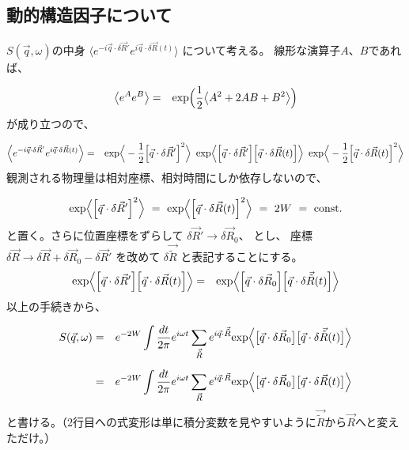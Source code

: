 \documentclass[a4j]{jsarticle}
\begin{document}
\subsection*{動的構造因子について}

$S(\vec{q},\omega)$の中身
$\big\langle e^{ - i \vec{q} \cdot \delta \vec{R}' } e^{i \vec{q} \cdot \delta \vec{R}(t) } \big\rangle$
について考える。
線形な演算子$A$、$B$であれば、


\begin{eqnarray}
	\big\langle e^{ A } e^{ B } \big\rangle
	&=&
	{\rm exp} \Big( \dfrac{1}{2} \big\langle A^{2} + 2 AB + B^{2} \big\rangle \Big)
\end{eqnarray}
が成り立つので、


\begin{eqnarray}
	\Big\langle e^{ - i \vec{q} \cdot \delta \vec{R}' } e^{i \vec{q} \cdot \delta \vec{R}(t) } \Big\rangle
	&=&
	{\rm exp} \Big\langle - \dfrac{1}{2} \Big[ \vec{q} \cdot \delta \vec{R}' \Big]^{2} \Big\rangle
	\ \ \!
	{\rm exp} \Big\langle \Big[ \vec{q} \cdot \delta \vec{R}' \Big] \Big[ \vec{q} \cdot \delta \vec{R}(t) \Big] \Big\rangle
	\ \ \!
	{\rm exp} \Big\langle - \dfrac{1}{2} \Big[ \vec{q} \cdot \delta \vec{R}(t) \Big]^{2} \Big\rangle
	\nonumber \\
\end{eqnarray}
観測される物理量は相対座標、相対時間にしか依存しないので、


\begin{eqnarray}
	{\rm exp} \Big\langle \Big[ \vec{q} \cdot \delta \vec{R}' \Big]^{2} \Big\rangle
	\ = \
	{\rm exp} \Big\langle \Big[ \vec{q} \cdot \delta \vec{R}(t) \Big]^{2} \Big\rangle
	\ = \
	2W
	\ = \
	{\rm const.}
\end{eqnarray}
と置く。さらに位置座標をずらして
$ \delta \vec{R}' \to \delta \vec{R}_{0}$、
とし、
座標
$\delta \vec{R} \to \delta \vec{R} + \delta \vec{R}_{0} - \delta \vec{R}'$
を改めて
$\delta \vec{\tilde{R}}$
と表記することにする。
\begin{eqnarray}
	{\rm exp} \Big\langle \Big[ \vec{q} \cdot \delta \vec{R}' \Big] \Big[ \vec{q} \cdot \delta \vec{R}(t) \Big] \Big\rangle
	&=&
	{\rm exp} \Big\langle \Big[ \vec{q} \cdot \delta \vec{R}_{0} \Big] \Big[ \vec{q} \cdot \delta \vec{\tilde{R}}(t) \Big] \Big\rangle
\end{eqnarray}
以上の手続きから、


\begin{eqnarray}
	S(\vec{q},\omega)
	&=&
	e^{-2W}
	\int \dfrac{ dt }{ 2 \pi }
	e^{ i \omega t }
	\sum_{ \vec{\tilde{R}} }
	e^{ i \vec{q} \cdot \vec{\tilde{R}} }
		{\rm exp}
	\Big\langle \big[ \vec{q} \cdot \delta \vec{R}_{0} \big] \big[ \vec{q} \cdot \delta \vec{\tilde{R}}(t) \big] \Big\rangle
	\nonumber \\[2mm] &=&
	e^{-2W}
	\int \dfrac{ dt }{ 2 \pi }
	e^{ i \omega t }
	\sum_{ \vec{R} }
	e^{ i \vec{q} \cdot \vec{R} }
		{\rm exp}
	\Big\langle \big[ \vec{q} \cdot \delta \vec{R}_{0} \big] \big[ \vec{q} \cdot \delta \vec{R}(t) \big] \Big\rangle
\end{eqnarray}
と書ける。（2行目への式変形は単に積分変数を見やすいように$\vec{\tilde{R}}$から$\vec{R}$へと変えただけ。）
\end{document}
